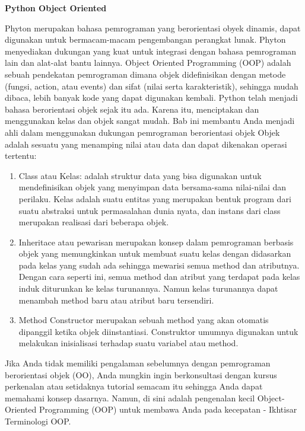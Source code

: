 \sloppy
\begin{center}{\fontsize{16pt}{16pt}\selectfont \textbf{Python Object Oriented} \\}\end{center}
Phyton merupakan bahasa pemrograman yang berorientasi obyek dinamis, dapat digunakan untuk bermacam-macam pengembangan perangkat lunak. Phyton menyediakan dukungan yang kuat untuk integrasi dengan bahasa pemrograman lain dan alat-alat bantu lainnya.
Object Oriented Programming (OOP) adalah sebuah pendekatan pemrograman dimana objek didefinisikan dengan metode (fungsi, action, atau events) dan sifat (nilai serta karakteristik), sehingga mudah dibaca, lebih banyak kode yang dapat digunakan kembali.
Python telah menjadi bahasa berorientasi objek sejak itu ada. Karena itu, menciptakan dan menggunakan kelas dan objek sangat mudah. Bab ini membantu Anda menjadi ahli dalam menggunakan dukungan pemrograman berorientasi objek
Objek adalah sesuatu yang menamping nilai atau data dan dapat dikenakan operasi tertentu:
\begin {enumerate}
\item Class atau Kelas: adalah struktur data yang bisa digunakan untuk mendefinisikan objek yang menyimpan data bersama-sama nilai-nilai dan perilaku. Kelas adalah suatu entitas yang merupakan bentuk program dari suatu abstraksi untuk permasalahan dunia nyata, dan instans dari class merupakan realisasi dari beberapa objek.
\item Inheritace atau pewarisan merupakan konsep dalam pemrograman berbasis objek yang memungkinkan untuk membuat suatu kelas dengan didasarkan pada kelas yang sudah ada sehingga mewarisi semua method dan atributnya. Dengan cara seperti ini, semua method dan atribut yang terdapat pada kelas induk diturunkan ke kelas turunannya. Namun kelas turunannya dapat menambah method baru atau atribut baru tersendiri.
\item Method Constructor merupakan sebuah method yang akan otomatis dipanggil ketika objek diinstantiasi. Construktor umumnya digunakan untuk melakukan inisialisasi terhadap suatu variabel atau method.
\end {enumerate}

Jika Anda tidak memiliki pengalaman sebelumnya dengan pemrograman berorientasi objek (OO), Anda mungkin  ingin berkonsultasi dengan kursus perkenalan atau setidaknya tutorial semacam itu sehingga Anda dapat memahami konsep dasarnya. Namun, di sini adalah pengenalan kecil Object-Oriented Programming (OOP) untuk membawa Anda pada kecepatan - Ikhtisar Terminologi OOP.

